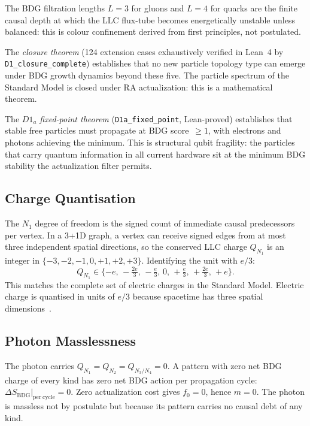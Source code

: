 \documentclass[11pt,a4paper]{article}
\newcommand{\SBDG}{S_{\mathrm{BDG}}}
\begin{document}
\noindent
The BDG filtration lengths $L = 3$ for gluons and $L = 4$ for quarks
are the finite causal depth at which the LLC flux-tube becomes energetically
unstable unless balanced: this is colour confinement derived from first
principles, not postulated.

The \emph{closure theorem} (124 extension cases exhaustively verified
in Lean~4 by \texttt{D1\_closure\_complete}) establishes that no new
particle topology type can emerge under BDG growth dynamics beyond these
five. The particle spectrum of the Standard Model is closed under RA
actualization: this is a mathematical theorem.

The \emph{$D1_a$ fixed-point theorem} (\texttt{D1a\_fixed\_point},
Lean-proved) establishes that stable free particles must propagate
at BDG score~$\geq 1$, with electrons and photons achieving the minimum.
This is structural qubit fragility: the particles that carry quantum
information in all current hardware sit at the minimum BDG stability
the actualization filter permits.

\subsection{Charge Quantisation}

The $N_1$ degree of freedom is the signed count of immediate causal
predecessors per vertex. In a 3+1D graph, a vertex can receive signed edges
from at most three independent spatial directions, so the conserved LLC
charge $Q_{N_1}$ is an integer in $\{-3, -2, -1, 0, +1, +2, +3\}$.
Identifying the unit with $e/3$:
\begin{equation}
  Q_{N_1} \in \{-e,\, -\tfrac{2e}{3},\, -\tfrac{e}{3},\, 0,\,
  +\tfrac{e}{3},\, +\tfrac{2e}{3},\, +e\}.
  \label{eq:charge_quant}
\end{equation}
This matches the complete set of electric charges in the Standard Model.
Electric charge is quantised in units of $e/3$ because spacetime has
three spatial dimensions~\citep{Sandeman2026RASM}.

\subsection{Photon Masslessness}

The photon carries $Q_{N_1} = Q_{N_2} = Q_{N_3/N_4} = 0$. A pattern with
zero net BDG charge of every kind has zero net BDG action per propagation
cycle: $\Delta\SBDG|_{\mathrm{per\ cycle}} = 0$. Zero actualization cost
gives $f_0 = 0$, hence $m = 0$. The photon is massless not by postulate
but because its pattern carries no causal debt of any kind.
\end{document}
